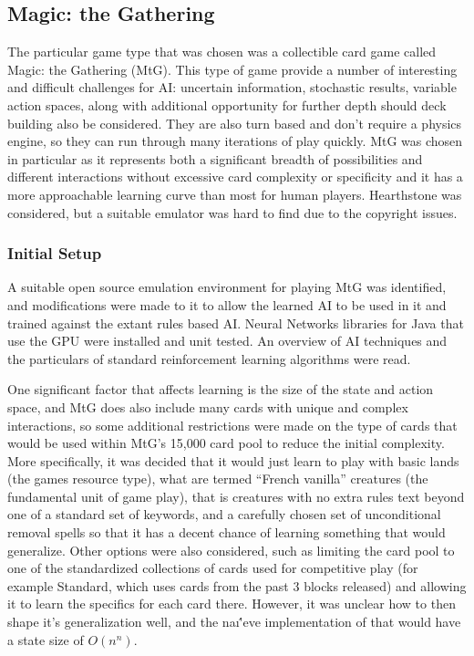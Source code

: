   \subsection{Magic: the Gathering}
  The particular game type that was chosen was a collectible card game called Magic: the Gathering (MtG). This type of game provide a number of interesting and difficult challenges for AI: uncertain information, stochastic results, variable action spaces, along with additional opportunity for further depth should deck building also be considered. They are also turn based and don't require a physics engine, so they can run through many iterations of play quickly. MtG was chosen in particular as it represents both a significant breadth of possibilities and different interactions without excessive card complexity or specificity and it has a more approachable learning curve than most for human players. Hearthstone was considered, but a suitable emulator was hard to find due to the copyright issues. 
 \subsubsection{Initial Setup}
      A suitable open source emulation environment for playing MtG was identified, and modifications were made to it to allow the learned AI to be used in it and trained against the extant rules based AI. Neural Networks libraries for Java that use the GPU were installed and unit tested. An overview of AI techniques and the particulars of standard reinforcement learning algorithms were read.
      
One significant factor that affects learning is the size of the state and action space, and MtG does also include many cards with unique and complex interactions, so some additional restrictions were made on the type of cards that would be used within MtG's 15,000 card pool to reduce the initial complexity. More specifically, it was decided that it would just learn to play with basic lands (the games resource type), what are termed ``French vanilla'' creatures (the fundamental unit of game play), that is creatures with no extra rules text beyond one of a standard set of keywords, and a carefully chosen set of unconditional removal spells so that it has a decent chance of learning something that would generalize. Other options were also considered, such as limiting the card pool to one of the standardized collections of cards used for competitive play (for example Standard, which uses cards from the past 3 blocks released) and allowing it to learn the specifics for each card there. However, it was unclear how to then shape it's generalization well, and the na\i\''eve implementation of that would have a state size of $O(n^n)$. 

